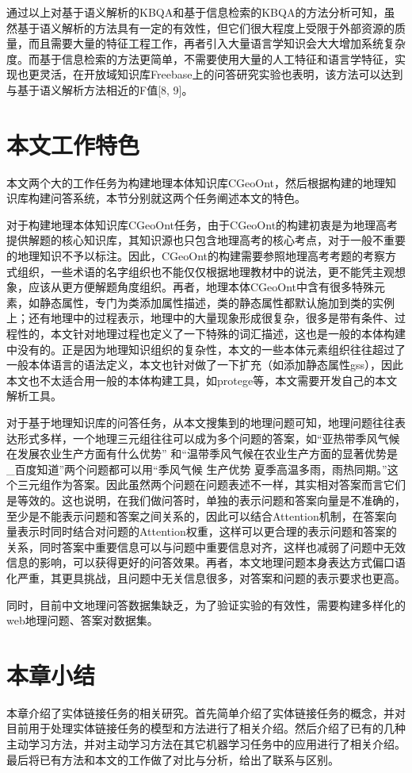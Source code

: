 通过以上对基于语义解析的KBQA和基于信息检索的KBQA的方法分析可知，虽然基于语义解析的方法具有一定的有效性，但它们很大程度上受限于外部资源的质量，而且需要大量的特征工程工作，再者引入大量语言学知识会大大增加系统复杂度。而基于信息检索的方法更简单，不需要使用大量的人工特征和语言学特征，实现也更灵活，在开放域知识库Freebase上的问答研究实验也表明，该方法可以达到与基于语义解析方法相近的F值\cite{Dong,Bordes2}[8, 9]。

\section{本文工作特色}
本文两个大的工作任务为构建地理本体知识库CGeoOnt，然后根据构建的地理知识库构建问答系统，本节分别就这两个任务阐述本文的特色。

对于构建地理本体知识库CGeoOnt任务，由于CGeoOnt的构建初衷是为地理高考提供解题的核心知识库，其知识源也只包含地理高考的核心考点，对于一般不重要的地理知识不予以标注。因此，CGeoOnt的构建需要参照地理高考考题的考察方式组织，一些术语的名字组织也不能仅仅根据地理教材中的说法，更不能凭主观想象，应该从更方便解题角度组织。再者，地理本体CGeoOnt中含有很多特殊元素，如静态属性，专门为类添加属性描述，类的静态属性都默认施加到类的实例上；还有地理中的过程表示，地理中的大量现象形成很复杂，很多是带有条件、过程性的，本文针对地理过程也定义了一下特殊的词汇描述，这也是一般的本体构建中没有的。正是因为地理知识组织的复杂性，本文的一些本体元素组织往往超过了一般本体语言的语法定义，本文也针对做了一下扩充（如添加静态属性gss），因此本文也不太适合用一般的本体构建工具，如protege等，本文需要开发自己的本文解析工具。

对于基于地理知识库的问答任务，从本文搜集到的地理问题可知，地理问题往往表达形式多样，一个地理三元组往往可以成为多个问题的答案，如“亚热带季风气候在发展农业生产方面有什么优势” 和“温带季风气候在农业生产方面的显著优势是\_百度知道”两个问题都可以用“季风气候 生产优势 夏季高温多雨，雨热同期。”这个三元组作为答案。因此虽然两个问题在问题表述不一样，其实相对答案而言它们是等效的。这也说明，在我们做问答时，单独的表示问题和答案向量是不准确的，至少是不能表示问题和答案之间关系的，因此可以结合Attention机制，在答案向量表示时同时结合对问题的Attention权重，这样可以更合理的表示问题和答案的关系，同时答案中重要信息可以与问题中重要信息对齐，这样也减弱了问题中无效信息的影响，可以获得更好的问答效果。再者，本文地理问题本身表达方式偏口语化严重，其更具挑战，且问题中无关信息很多，对答案和问题的表示要求也更高。

同时，目前中文地理问答数据集缺乏，为了验证实验的有效性，需要构建多样化的web地理问题、答案对数据集。


\section{本章小结}
本章介绍了实体链接任务的相关研究。首先简单介绍了实体链接任务的概念，并对目前用于处理实体链接任务的模型和方法进行了相关介绍。然后介绍了已有的几种主动学习方法，并对主动学习方法在其它机器学习任务中的应用进行了相关介绍。最后将已有方法和本文的工作做了对比与分析，给出了联系与区别。